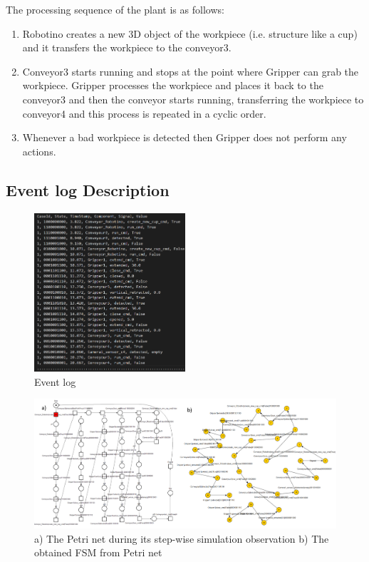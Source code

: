 \begin{bibunit}
The  processing sequence of the plant is as follows: 

\begin{enumerate}

  \item Robotino creates a new 3D object of the workpiece (i.e. structure like a cup) and it transfers the workpiece to the conveyor3.  
  \item Conveyor3 starts running and stops at the point where Gripper can grab the workpiece. Gripper processes the workpiece and places it back to the conveyor3 and then the conveyor starts running, transferring the workpiece to conveyor4 and this process is repeated in a cyclic order.
  \item Whenever a bad workpiece is detected then Gripper does not perform any actions.
\end{enumerate}




\subsection{Event log Description}


\begin{figure}[!t]
	\centering
	\includegraphics[width=0.5\textwidth]{MX_Papers/Paper6/images/EL1.PNG}
	\caption{Event log}
	\label{SIM_EL}
\end{figure}

\begin{figure}[!t]
	\centering
	\includegraphics[width=1\textwidth]{MX_Papers/Paper6/images/PNFSMPNG.PNG}
	\caption{a) The Petri net during its step-wise simulation observation b) The obtained FSM from Petri net}
	\label{SIM_Yed}
\end{figure}



\end{bibunit}
